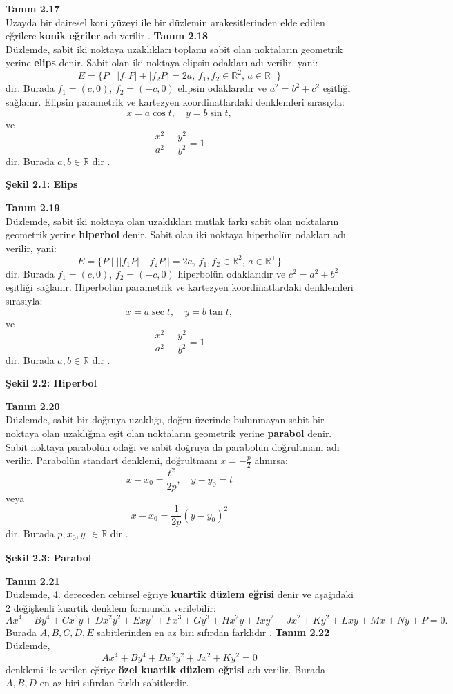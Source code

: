 \documentclass[a4paper,12pt]{article}
\begin{document}
\textbf{Tanım 2.17} \\
Uzayda bir dairesel koni yüzeyi ile bir düzlemin arakesitlerinden elde edilen eğrilere \textbf{konik eğriler} adı verilir \cite{ref5}.
\textbf{Tanım 2.18} \\
Düzlemde, sabit iki noktaya uzaklıkları toplamı sabit olan noktaların geometrik yerine \textbf{elips} denir. Sabit olan iki noktaya elipsin odakları adı verilir, yani:
\[
E = \{P \mid |f_1P| + |f_2P| = 2a, \, f_1, f_2 \in \mathbb{R}^2, \, a \in \mathbb{R}^+\}
\]
dir. Burada $f_1 = (c, 0)$, $f_2 = (-c, 0)$ elipsin odaklarıdır ve $a^2 = b^2 + c^2$ eşitliği sağlanır. Elipsin parametrik ve kartezyen koordinatlardaki denklemleri sırasıyla:
\[
x = a \cos t, \quad y = b \sin t,
\]
ve
\[
\frac{x^2}{a^2} + \frac{y^2}{b^2} = 1
\]
dir. Burada $a, b \in \mathbb{R}$ dir \cite{ref}.

\textbf{Şekil 2.1: Elips}

\textbf{Tanım 2.19} \\
Düzlemde, sabit iki noktaya olan uzaklıkları mutlak farkı sabit olan noktaların geometrik yerine \textbf{hiperbol} denir. Sabit olan iki noktaya hiperbolün odakları adı verilir, yani:
\[
E = \{P \mid ||f_1P| - |f_2P|| = 2a, \, f_1, f_2 \in \mathbb{R}^2, \, a \in \mathbb{R}^+\}
\]
dir. Burada $f_1 = (c, 0)$, $f_2 = (-c, 0)$ hiperbolün odaklarıdır ve $c^2 = a^2 + b^2$ eşitliği sağlanır. Hiperbolün parametrik ve kartezyen koordinatlardaki denklemleri sırasıyla:
\[
x = a \sec t, \quad y = b \tan t,
\]
ve
\[
\frac{x^2}{a^2} - \frac{y^2}{b^2} = 1
\]
dir. Burada $a, b \in \mathbb{R}$ dir \cite{ref}.

\textbf{Şekil 2.2: Hiperbol}

\textbf{Tanım 2.20} \\
Düzlemde, sabit bir doğruya uzaklığı, doğru üzerinde bulunmayan sabit bir noktaya olan uzaklığına eşit olan noktaların geometrik yerine \textbf{parabol} denir. Sabit noktaya parabolün odağı ve sabit doğruya da parabolün doğrultmanı adı verilir. Parabolün standart denklemi, doğrultmanı $x = -\frac{p}{2}$ alınırsa:
\[
x - x_0 = \frac{t^2}{2p}, \quad y - y_0 = t
\]
veya
\[
x - x_0 = \frac{1}{2p}(y - y_0)^2
\]
dir. Burada $p, x_0, y_0 \in \mathbb{R}$ dir \cite{ref}.

\textbf{Şekil 2.3: Parabol}

\textbf{Tanım 2.21} \\
Düzlemde, 4. dereceden cebirsel eğriye \textbf{kuartik düzlem eğrisi} denir ve aşağıdaki 2 değişkenli kuartik denklem formunda verilebilir:
\[
Ax^4 + By^4 + Cx^3y + Dx^2y^2 + Exy^3 + Fx^3 + Gy^3 + Hx^2y + Ixy^2 + Jx^2 + Ky^2 + Lxy + Mx + Ny + P = 0.
\]
Burada $A, B, C, D, E$ sabitlerinden en az biri sıfırdan farklıdır \cite{ref2}.
\textbf{Tanım 2.22} \\
Düzlemde,
\[
Ax^4 + By^4 + Dx^2y^2 + Jx^2 + Ky^2 = 0
\]
denklemi ile verilen eğriye \textbf{özel kuartik düzlem eğrisi} adı verilir. Burada $A, B, D$ en az biri sıfırdan farklı sabitlerdir.
\end{document}
